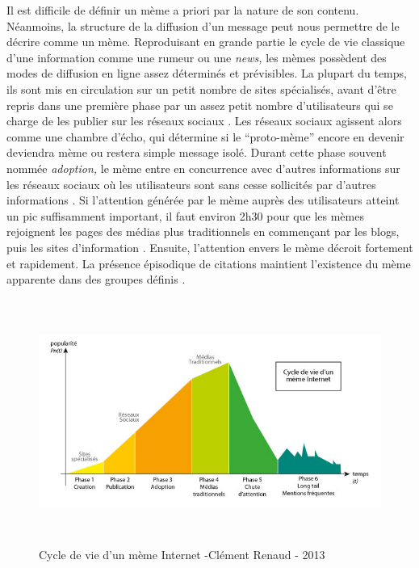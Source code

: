 Il est difficile de définir un mème a priori par la nature de son contenu. Néanmoins, la structure de la diffusion d{\textquoteright}un message peut nous permettre de le décrire comme un mème. Reproduisant en grande partie le cycle de vie classique d{\textquoteright}une information comme une rumeur ou une \textit{news, }les mèmes possèdent des modes de diffusion en ligne assez déterminés et prévisibles. La plupart du temps, ils sont mis en circulation sur un petit nombre de sites spécialisés, avant d{\textquoteright}être repris dans une première phase par un assez petit nombre d{\textquoteright}utilisateurs qui se charge de les publier sur les réseaux sociaux \citep{Bauckhage2011}. Les réseaux sociaux agissent alors comme une chambre d{\textquoteright}écho, qui détermine si le {\textquotedblleft}proto-mème{\textquotedblright} encore en devenir deviendra mème ou restera simple message isolé. Durant cette phase souvent nommée \textit{adoption,} le mème entre en concurrence avec d{\textquoteright}autres informations sur les réseaux sociaux o\`u les utilisateurs sont sans cesse sollicités par d{\textquoteright}autres informations \citep{Davenport2001}. Si l{\textquoteright}attention générée par le mème auprès des utilisateurs atteint un pic suffisamment important, il faut environ 2h30 pour que les mèmes rejoignent les pages des médias plus traditionnels en commen\c{c}ant par les blogs, puis les sites d{\textquoteright}information \citep{Leskovec2009}. Ensuite, l{\textquoteright}attention envers le mème décroit fortement et rapidement. La présence épisodique de citations maintient l{\textquoteright}existence du mème apparente dans des groupes définis \citep{Buchel2012}.

\begin{figure}[h]
    \centering
    \includegraphics[width=6.2559in,height=3.1559in]{figures/chap2/chapitre2-img2.jpg}
    \caption[Cycle de vie d{\textquoteright}un mème Internet]{Cycle de vie d{\textquoteright}un mème Internet -Clément Renaud - 2013}
    \label{fig:meme-lifecycle}
\end{figure}

